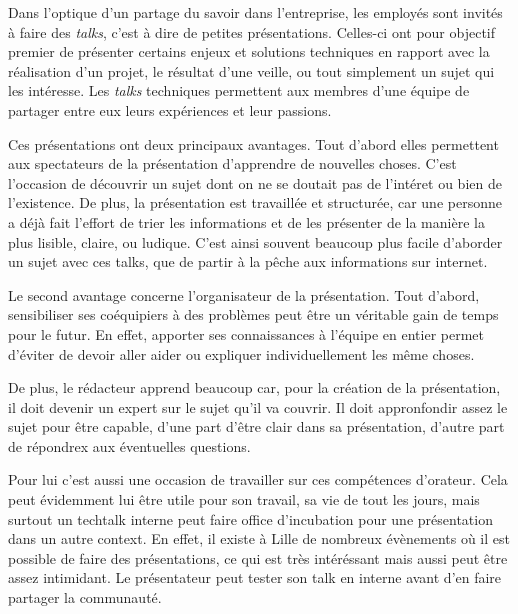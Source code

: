 \bigskip

Dans l'optique d'un partage du savoir dans l'entreprise, les employés
sont invités à faire des \emph{talks}, c'est à dire de petites
présentations. Celles-ci ont pour objectif premier de présenter certains
enjeux et solutions techniques en rapport avec la réalisation d'un
projet, le résultat d'une veille, ou tout simplement un sujet qui les
intéresse. Les \emph{talks} techniques permettent aux membres d'une
équipe de partager entre eux leurs expériences et leur passions.

\bigskip

Ces présentations ont deux principaux avantages. Tout d'abord elles
permettent aux spectateurs de la présentation d'apprendre de nouvelles
choses. C'est l'occasion de découvrir un sujet dont on ne se doutait pas
de l'intéret ou bien de l'existence. De plus, la présentation est
travaillée et structurée, car une personne a déjà fait l'effort de trier
les informations et de les présenter de la manière la plus lisible,
claire, ou ludique. C'est ainsi souvent beaucoup plus facile d'aborder
un sujet avec ces talks, que de partir à la pêche aux informations sur
internet.

\bigskip

Le second avantage concerne l'organisateur de la présentation. Tout
d'abord, sensibiliser ses coéquipiers à des problèmes peut être un
véritable gain de temps pour le futur. En effet, apporter ses
connaissances à l'équipe en entier permet d'éviter de devoir aller aider
ou expliquer individuellement les même choses.

\bigskip

De plus, le rédacteur apprend beaucoup car, pour la création de la
présentation, il doit devenir un expert sur le sujet qu'il va couvrir.
Il doit appronfondir assez le sujet pour être capable, d'une part d'être
clair dans sa présentation, d'autre part de répondrex aux éventuelles
questions.

\bigskip

Pour lui c'est aussi une occasion de travailler sur ces compétences
d'orateur. Cela peut évidemment lui être utile pour son travail, sa vie
de tout les jours, mais surtout un techtalk interne peut faire office
d'incubation pour une présentation dans un autre context. En effet, il
existe à Lille de nombreux évènements où il est possible de faire des
présentations, ce qui est très intéréssant mais aussi peut être assez
intimidant. Le présentateur peut tester son talk en interne avant d'en
faire partager la communauté.

